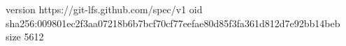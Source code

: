 version https://git-lfs.github.com/spec/v1
oid sha256:009801ec2f3aa07218b6b7bcf70cf77eefae80d85f3fa361d812d7e92bb14beb
size 5612
